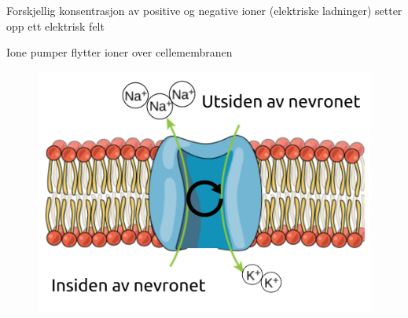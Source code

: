 \documentclass[presentation]{beamer}
\begin{document}
\begin{frame}{Forskjellig konsentrasjon av positive og negative ioner (elektriske ladninger) setter opp ett elektrisk felt}
\begin{figure}
\end{figure}
\end{frame}


\begin{frame}{Ione pumper flytter ioner over cellemembranen}
   \begin{figure}
       {\includegraphics[width=1\textwidth]{ion_pump2.png}}
\end{figure}
\end{frame}
\end{document}
